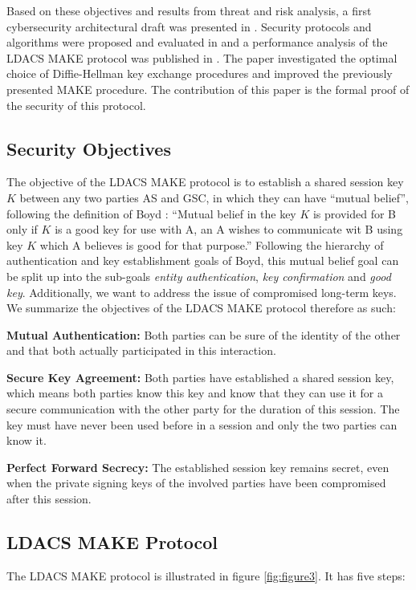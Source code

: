 Based on these objectives and results from threat and risk analysis, a first cybersecurity architectural draft was presented in \cite{maeurer20182}. Security protocols and algorithms were proposed and evaluated in \cite{maeurer20191} and a performance analysis of the \ac{LDACS} \ac{MAKE} protocol was published in \cite{maeurer20192}. The paper \cite{maeurer2020} investigated the optimal choice of Diffie-Hellman key exchange procedures and improved the previously presented \ac{MAKE} procedure. The contribution of this paper is the formal proof of the security of this protocol.

\subsection{Security Objectives}
The objective of the LDACS MAKE protocol is to establish a shared session key $K$ between any two parties AS and GSC, in which they can have ``mutual belief'', following the definition of Boyd \cite{boyd2020}: ``Mutual belief in the key $K$ is provided for B only if $K$ is a good key for use with A, an A wishes to communicate wit B using key $K$ which A believes is good for that purpose.'' Following the hierarchy of authentication and key establishment goals of Boyd, this mutual belief goal can be split up into the sub-goals \textit{entity authentication}, \textit{key confirmation} and \textit{good key}. Additionally, we want to address the issue of compromised long-term keys. We summarize the objectives of the \ac{LDACS} \ac{MAKE} protocol therefore as such:

\vspace{0.5em}
\textbf{Mutual Authentication:} Both parties can be sure of the identity of the other and that both actually participated in this interaction. 

\vspace{0.5em}
\textbf{Secure Key Agreement:} Both parties have established a shared session key, which means both parties know this key and know that they can use it for a secure communication with the other party for the duration of this session. The key must have never been used before in a session and only the two parties can know it.

\vspace{0.5em}
\textbf{Perfect Forward Secrecy:} The established session key remains secret, even when the private signing keys of the involved parties have been compromised after this session.

\subsection{LDACS MAKE Protocol}
\label{subsec:LDACSMAKE}
The \ac{LDACS} \ac{MAKE} protocol is illustrated in figure \ref{fig:figure3}. It has five steps:


